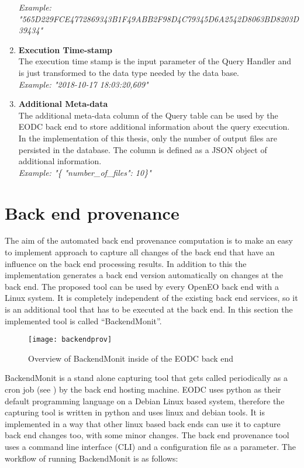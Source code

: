 \documentclass[draft,final]{vutinfth} %
\begin{document}
\begin{enumerate}
	\textit{Example: "565D229FCE4772869343B1F49ABB2F98D4C79345D6A2542D8063BD8203D39434"} 
	\item \textbf{Execution Time-stamp} \\
	The execution time stamp is the input parameter of the Query Handler and is just transformed to the data type needed by the data base. 	\\
	\textit{Example: "2018-10-17 18:03:20,609"}  
	\item \textbf{Additional Meta-data} \\
	The additional meta-data column of the Query table can be used by the EODC back end to store additional information about the query execution. In the implementation of this thesis, only the number of output files are persisted in the database. The column is defined as a JSON object of additional information. \\
	\textit{Example: "\{ "number\_of\_files": 10\}"}    	 
\end{enumerate}

\section{Back end provenance}\label{Implementation:Back end provenance}
The aim of the automated back end provenance computation is to make an easy to implement approach to capture all changes of the back end that have an influence on the back end processing results. In addition to this the implementation generates a back end version automatically on changes at the back end. The proposed tool can be used by every OpenEO back end with a Linux system. It is completely independent of the existing back end services, so it is an additional tool that has to be executed at the back end. In this section the implemented tool is called “BackendMonit”. 
\begin{figure}[h]
	\centering
	\texttt{[image: backendprov]}
	\caption{Overview of BackendMonit inside of the EODC back end}
	\label{fig:backendprov} %
\end{figure}

BackendMonit is a stand alone capturing tool that gets called periodically as a cron job (see \cite{crontab}) by the back end hosting machine. EODC uses python as their default programming language on a Debian Linux based system, therefore the capturing tool is written in python and uses linux and debian tools. It is implemented in a way that other linux based back ends can use it to capture back end changes too, with some minor changes. The back end provenance tool uses a command line interface (CLI)  and a configuration file as a parameter. 
The workflow of running BackendMonit is as follows: 
\end{document}
